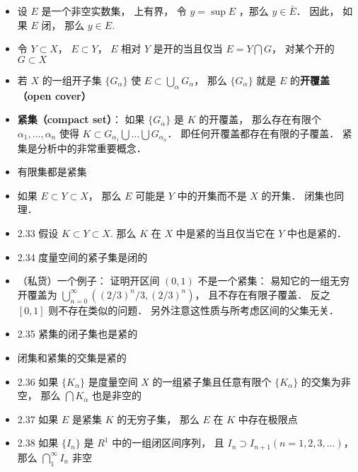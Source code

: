 \begin{itemize}
\item 设 $E$ 是一个非空实数集， 上有界， 令 $y = \sup E$ ，那么 $y \in \bar E$．
因此， 如果 $E$ 闭， 那么 $y \in E$.

\item 令 $Y \subset X$， $E \subset Y$， $E$ 相对 $Y$ 是开的当且仅当 $E = Y \bigcap G$， 对某个开的 $G \subset X$

\item 若 $X$ 的一组开子集 $\{G_\alpha\}$ 使 $E \subset \bigcup_\alpha G_\alpha$， 那么 $\{G_\alpha\}$ 就是 $E$ 的\textbf{开覆盖（open cover）}

\item \textbf{紧集（compact set）}： 如果 $\{G_\alpha\}$ 是 $K$ 的开覆盖， 那么存在有限个 $\alpha_1,\dots, \alpha_n$ 使得 $K \subset G_{\alpha_1} \bigcup \dots \bigcup G_{\alpha_n}$． 即任何开覆盖都存在有限的子覆盖． 紧集是分析中的非常重要概念．

\item 有限集都是紧集

\item 如果 $E \subset Y \subset X$， 那么 $E$ 可能是 $Y$ 中的开集而不是 $X$ 的开集． 闭集也同理．

\item 2.33 假设 $K \subset Y \subset X$. 那么 $K$ 在 $X$ 中是紧的当且仅当它在 $Y$ 中也是紧的．

\item 2.34 度量空间的紧子集是闭的

\item （私货）一个例子： 证明开区间 $(0,1)$ 不是一个紧集： 易知它的一组无穷开覆盖为 $\bigcup_{n=0}^{\infty}((2/3)^n/3, (2/3)^n)$， 且不存在有限子覆盖． 反之 $[0,1]$ 则不存在类似的问题． 另外注意这性质与所考虑区间的父集无关．

\item 2.35 紧集的闭子集也是紧的

\item 闭集和紧集的交集是紧的

\item 2.36 如果 $\{K_\alpha\}$ 是度量空间 $X$ 的一组紧子集且任意有限个 $\{K_\alpha\}$ 的交集为非空， 那么 $\bigcap K_\alpha$ 也是非空的

\item 2.37 如果 $E$ 是紧集 $K$ 的无穷子集， 那么 $E$ 在 $K$ 中存在极限点

\item 2.38 如果 $\{I_n\}$ 是 $R^1$ 中的一组闭区间序列， 且 $I_n \supset I_{n+1} (n = 1, 2, 3,\dots)$， 那么 $\bigcap_1^\infty I_n$ 非空


\end{itemize}
